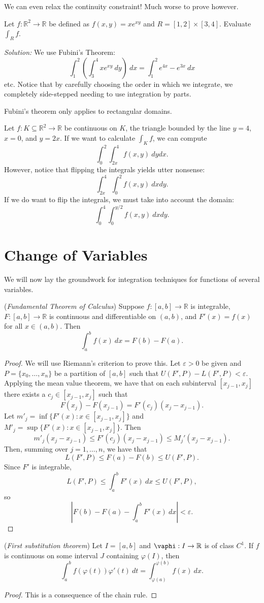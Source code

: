 \documentclass[11pt]{article}
\theoremstyle{definition}
\newcommand{\R}{\mathbb{R}}                      %
\begin{document}
\note We can even relax the continuity constraint! Much worse to prove however.


\ex Let $f:\R^2\to\R$ be defined as $f(x,y)=xe^{xy}$ and $R=[1,2]\times[3,4]$. Evaluate $\int_R f$.

\textit{Solution:} We use Fubini's Theorem:
$$
\int_1^2\left(\int_3^4 xe^{xy}~dy\right)~dx=\int_1^2 e^{4x}-e^{3x}~dx
$$
etc. Notice that by carefully choosing the order in which we integrate, we completely side-stepped needing to use integration by parts.

\note Fubini's theorem only applies to rectangular domains.

\ex Let $f:K\subseteq \R^2\to \R$ be continuous on $K$, the triangle bounded by the line $y=4$, $x=0$, and $y=2x$. If we want to calculate $\int_K f$, we can compute
$$
\int_0^2 \int_{2x}^4 f(x,y)~dydx.
$$
However, notice that flipping the integrals yields utter nonsense:
$$
\int_{2x}^4\int_0^2 f(x,y)~dxdy.
$$
If we do want to flip the integrals, we must take into account the domain:
$$
\int_0^4 \int_0^{y/2} f(x,y)~dxdy.
$$

\section{Change of Variables}
We will now lay the groundwork for integration techniques for functions of several variables. 
\begin{shaded}
\theorem (\textit{Fundamental Theorem of Calculus}) Suppose $f:[a,b]\to \R$ is integrable, $F:[a,b]\to \R$ is continuous and differentiable on $(a,b)$, and $F'(x)=f(x)$ for all $x\in(a,b)$. Then 
$$
\int_a^b f(x)~dx=F(b)-F(a).
$$
\end{shaded}

\begin{proof}
    We will use Riemann's criterion to prove this. Let $\varepsilon>0$ be given and $P=\{x_0,\dots,x_n\}$ be a partition of $[a,b]$ such that $U(F',P)-L(F',P)<\varepsilon$. Applying the mean value theorem, we have that on each subinterval $[x_{j-1},x_j]$ there exists a $c_j\in[x_{j-1},x_j]$ such that
    $$
    F(x_j)-F(x_{j-1})=F'(c_j)(x_j-x_{j-1}).
    $$
    Let $m'_j=\inf\{F'(x):x\in[x_{j-1},x_j]\}$ and $M'_j=\sup\{F'(x):x\in[x_{j-1},x_j]\}$. Then
    $$
    m'_j(x_j-x_{j-1})\leq F'(c_j)(x_j-x_{j-1})\leq M_j'(x_j-x_{j-1}).
    $$
    Then, summing over $j=1,\dots, n$, we have that
    $$
    L(F',P)\leq F(a)-F(b)\leq U(F',P).
    $$
    Since $F'$ is integrable, 
    $$
    L(F',P)\leq \int_a^b F'(x)~dx\leq U(F',P),
    $$
    so
    $$
    \left|F(b)-F(a)-\int_a^b F'(x)~dx\right|<\varepsilon.
    $$
\end{proof}

\prop (\textit{First substitution theorem}) Let $I=[a,b]$ and $\vaphi:I\to \R$ is of class $C^1$. If $f$ is continuous on some interval $J$ containing $\varphi(I)$, then 
$$
\int_a^b f(\varphi(t))\varphi'(t)~dt=\int_{\varphi(a)}^{\varphi(b)} f(x)~dx.
$$
\begin{proof}
    This is a consequence of the chain rule.
\end{proof}
\end{document}
